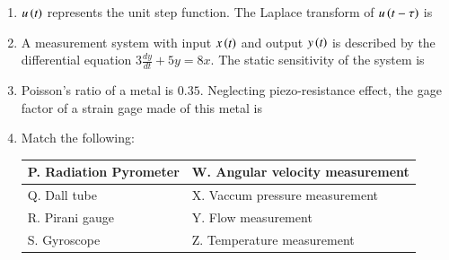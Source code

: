 \documentclass[journal,12pt,onecolumn]{IEEEtran}
\theoremstyle{remark}
\begin{document}
\begin{enumerate}
\item $u\left(t\right)$ represents the unit step function. The Laplace transform of $u\left(t - \tau\right)$ is

\hfill{}
\begin{enumerate}
\end{enumerate}

\item A measurement system with input $x\left(t\right)$ and output $y\left(t\right)$ is described by the differential equation $3\frac{dy}{dt} + 5y = 8x$. The static sensitivity of the system is

\hfill{}
\begin{enumerate}
\end{enumerate}

\item Poisson's ratio of a metal is $0.35$. Neglecting piezo-resistance effect, the gage factor of a strain gage made of this metal is

\hfill{}
\begin{enumerate}
\end{enumerate}

\item Match the following:
\begin{center}
\begin{tabular}{|m{18em}|m{18em}|}
\hline
    P. Radiation Pyrometer & W. Angular velocity measurement  \\
\hline
    Q. Dall tube & X. Vaccum pressure measurement \\
\hline
    R. Pirani gauge & Y. Flow measurement \\
\hline
    S. Gyroscope & Z. Temperature measurement \\
    \hline
\end{tabular}
\end{center}


\end{enumerate}
\end{document}
